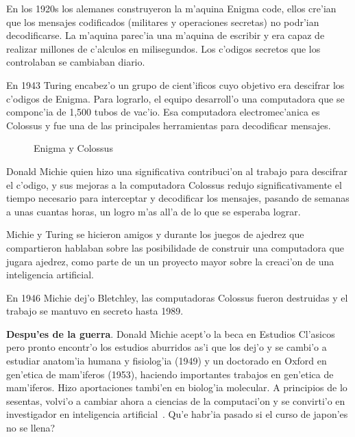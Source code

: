 \documentclass[11pt]{article}
\begin{document}
\medskip
En los 1920s los alemanes construyeron la m'aquina Enigma code, ellos cre'ian que los mensajes codificados (militares y operaciones secretas) no podr'ian decodificarse. La m'aquina parec'ia una m'aquina de escribir y era capaz de realizar millones de c'alculos en milisegundos. Los c'odigos secretos que los controlaban se cambiaban diario.

En 1943 Turing encabez'o un grupo de cient'ificos cuyo objetivo era descifrar los c'odigos de Enigma. Para lograrlo, el equipo desarroll'o una computadora que se componc'ia de 1,500 tubos de vac'io. Esa computadora electromec'anica es Colossus y fue una de las principales herramientas para decodificar mensajes.

\begin{figure}[h]
\begin{center}

\caption{Enigma y Colossus}
  \label{fig:enigmacolossus}
\end{center}
\end{figure} 

Donald Michie quien hizo una significativa contribuci'on al trabajo para descifrar el c'odigo, y sus mejoras a la computadora Colossus redujo significativamente el tiempo necesario para interceptar y decodificar los mensajes, pasando de semanas a unas cuantas horas, un logro m'as all'a de lo que se esperaba lograr.

Michie y Turing se hicieron amigos y durante los juegos de ajedrez que compartieron hablaban sobre las posibilidade de construir una computadora que jugara ajedrez, como parte de un un proyecto mayor sobre la creaci'on de una inteligencia artificial.

En 1946 Michie dej'o Bletchley, las computadoras Colossus fueron destruidas y el trabajo se mantuvo en secreto hasta 1989.

\medskip
\textbf{Despu'es de la guerra}. Donald Michie acept'o la beca en Estudios Cl'asicos pero pronto encontr'o los estudios aburridos as'i que los dej'o y se cambi'o a estudiar anatom'ia humana y fisiolog'ia (1949) y un doctorado en Oxford en gen'etica de mam'iferos (1953), haciendo importantes trabajos en gen'etica de mam'iferos. Hizo aportaciones tambi'en en biolog'ia molecular. A principios de lo sesentas, volvi'o a cambiar ahora a ciencias de la computaci'on y se convirti'o en investigador en inteligencia artificial~\cite{colossusJack}. \textquestiondown Qu'e habr'ia pasado si el curso de japon'es no se llena?
\end{document}
